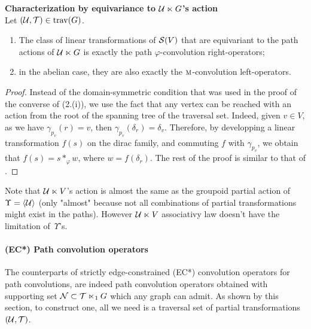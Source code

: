 \begin{proposition}\textbf{Characterization by equivariance to $\mathcal{U} \ltimes G$'s action}\\
Let $(\mathcal{U}, \mathcal{T}) \in \operatorname{trav}(G)$.
\begin{enumerate}[label=(\roman*)]
\item The class of linear transformations of $\mathcal{S}(V)$ that are equivariant to the path actions of $\mathcal{U} \ltimes G$ is exactly the path $\varphi$-convolution right-operators;
\item in the abelian case, they are also exactly the $\operatorname{\textsc{m}}$-convolution left-operators.
\end{enumerate}
\end{proposition}

\begin{proof}
Instead of the domain-symmetric condition that was used in the proof of the converse of  (2.(i)), we use the fact that any vertex can be reached with an action from the root of the spanning tree of the traversal set. Indeed, given $v \in V$, as we have $\gamma_{p_v}(r)=v$, then $\gamma_{p_v}(\delta_r) = \delta_v$. Therefore, by developping a linear transformation $f(s)$ on the dirac family, and commuting $f$ with $\gamma_{p_v}$, we obtain that $f(s) = s \ast_\varphi w$, where $w = f(\delta_r)$. The rest of the proof is similar to that of .
\end{proof}

\begin{remark}
Note that $\mathcal{U} \ltimes V$'s action is almost the same as the groupoid partial action of $\Upsilon = \langle \mathcal{U} \rangle$ (only "almost" because not all combinations of partial transformations might exist in the paths). However $\mathcal{U} \ltimes V$ associativy law doesn't have the limitation of~$\Upsilon$'s.
\end{remark}

\paragraph{(EC*) Path convolution operators}
The counterparts of strictly edge-constrained (EC*) convolution operators for path convolutions, are indeed path convolution operators obtained with supporting set $\mathcal{N} \subset \mathcal{T} \ltimes_1 G$ which any graph can admit. As shown by this section, to construct one, all we need is a traversal set of partial transformations $(\mathcal{U}, \mathcal{T})$.

